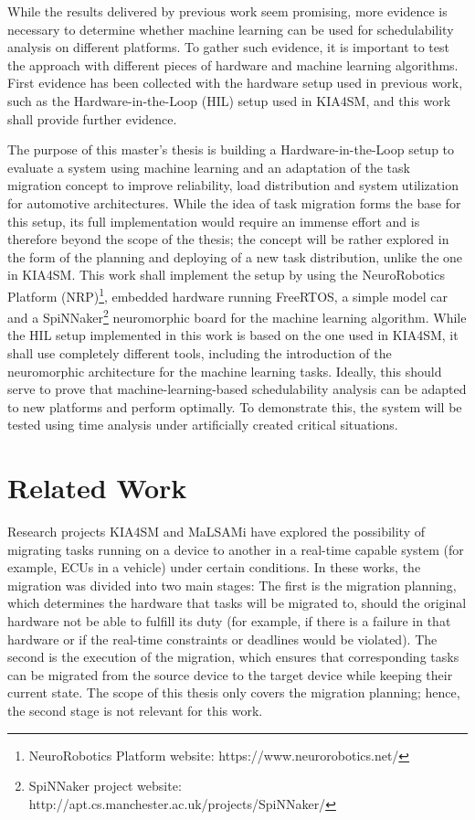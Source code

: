While the results delivered by previous work seem promising, more evidence is necessary to determine whether machine learning can be used for schedulability analysis on different platforms. To gather such evidence, it is important to test the approach with different pieces of hardware and machine learning algorithms. First evidence has been collected with the hardware setup used in previous work, such as the Hardware-in-the-Loop (HIL) setup used in KIA4SM, and this work shall provide further evidence.

The purpose of this master’s thesis is building a Hardware-in-the-Loop setup to evaluate a system using machine learning and an adaptation of the task migration concept to improve reliability, load distribution and system utilization for automotive architectures. While the idea of task migration forms the base for this setup, its full implementation would require an immense effort and is therefore beyond the scope of the thesis; the concept will be rather explored in the form of the planning and deploying of a new task distribution, unlike the one in KIA4SM. This work shall implement the setup by using the NeuroRobotics Platform (NRP)\footnote{NeuroRobotics Platform website: https://www.neurorobotics.net/}, embedded hardware running FreeRTOS, a simple model car and a SpiNNaker\footnote{SpiNNaker project website: http://apt.cs.manchester.ac.uk/projects/SpiNNaker/} neuromorphic board for the machine learning algorithm. While the HIL setup implemented in this work is based on the one used in KIA4SM, it shall use completely different tools, including the introduction of the neuromorphic architecture for the machine learning tasks. Ideally, this should serve to prove that machine-learning-based schedulability analysis can be adapted to new platforms and perform optimally. To demonstrate this, the system will be tested using time analysis under artificially created critical situations.

\section*{Related Work}\label{section:relatedwork}
Research projects KIA4SM and MaLSAMi have explored the possibility of migrating tasks running on a device to another in a real-time capable system (for example, ECUs in a vehicle) under certain conditions. In these works, the migration was divided into two main stages: The first is the migration planning, which determines the hardware that tasks will be migrated to, should the original hardware not be able to fulfill its duty (for example, if there is a failure in that hardware or if the real-time constraints or deadlines would be violated). The second is the execution of the migration, which ensures that corresponding tasks can be migrated from the source device to the target device while keeping their current state. The scope of this thesis only covers the migration planning; hence, the second stage is not relevant for this work.

